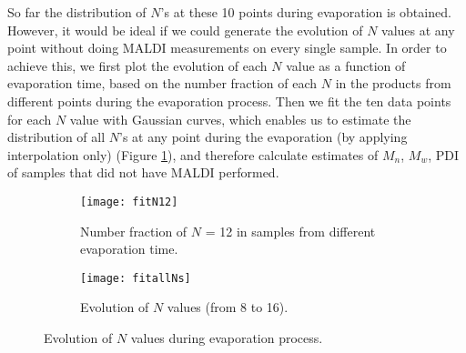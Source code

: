 So far the distribution of $N$'s at these 10 points during evaporation is obtained. However, it would be ideal if we could generate the evolution of $N$ values at any point without doing MALDI measurements on every single sample. In order to achieve this, we first plot the evolution of each $N$ value as a function of evaporation time, based on the number fraction of each $N$ in the products from different points during the evaporation process. Then we fit the ten data points for each $N$ value with Gaussian curves, which enables us to estimate the distribution of all $N$'s at any point during the evaporation (by applying interpolation only) (Figure \ref{fig:Nevolution}), and therefore calculate estimates of $M_{n}$, $M_{w}$, PDI of samples that did not have MALDI performed.

\begin{figure}[H]
  \centering
  \begin{subfigure}[b]{0.5\linewidth}
    \texttt{[image: fitN12]}
    \caption{Number fraction of $N$ = 12 in samples from different evaporation time.}
    \vspace{1cm}
  \end{subfigure}
  \begin{subfigure}[b]{0.5\linewidth}
    \texttt{[image: fitallNs]}
    \caption{Evolution of $N$ values (from 8 to 16).}
  \end{subfigure}
  \caption{Evolution of $N$ values during evaporation process.}
  \label{fig:Nevolution}
\end{figure}